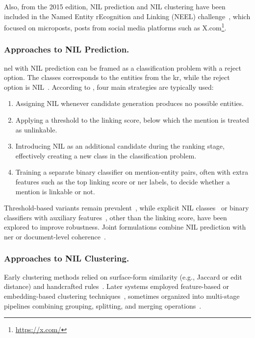 Also, from the 2015 edition, NIL prediction and NIL clustering have been included in the Named Entity rEcognition and Linking (NEEL) challenge~\cite{rizzo2017lessons}, which focused on microposts, \ie posts from social media platforms such as X.com\footnote{\url{https://x.com/}}.


\subsubsection{Approaches to NIL Prediction.}
\Acl{nel} with NIL prediction can be framed as a classification problem with a reject option. The classes corresponds to the entities from the \ac{kr}, while the reject option is NIL~\cite{Sevgili2022NeuralEL}. According to \textcite{Sevgili2022NeuralEL}, four main strategies are typically used:
\begin{enumerate}
\item Assigning NIL whenever candidate generation produces no possible entities.
\item Applying a threshold to the linking score, below which the mention is treated as unlinkable.
\item Introducing NIL as an additional candidate during the ranking stage, effectively creating a new class in the classification problem.
\item Training a separate binary classifier on mention-entity pairs, often with extra features such as the top linking score or \ac{ner} labels, to decide whether a mention is linkable or not.
\end{enumerate}


Threshold-based variants remain prevalent~\cite{BernierColborne2017CRIMsSF,Jiang2017SRCBED,tan2015buptteam}, while explicit NIL classes~\cite{Broscheit_2019,Rao2013EntityLF,Li2017AHM} or binary classifiers with auxiliary features~\cite{moreno_combining_word_entity_embeddings_2017,Yang2017TheTS}, other than the linking score, have been explored to improve robustness.  
Joint formulations combine NIL prediction with \ac{ner} or document-level coherence~\cite{martins-etal-2019-joint,Fahrni2012HITSMA}.

\subsubsection{Approaches to NIL Clustering.}
Early clustering methods relied on surface-form similarity (e.g., Jaccard or edit distance) and handcrafted rules~\cite{simone_15,simone_33,simone_68}. Later systems employed feature-based or embedding-based clustering techniques~\cite{simone_77,simone_2,blissett-ji-2019-cross}, sometimes organized into multi-stage pipelines combining grouping, splitting, and merging operations~\cite{simone_24}.


